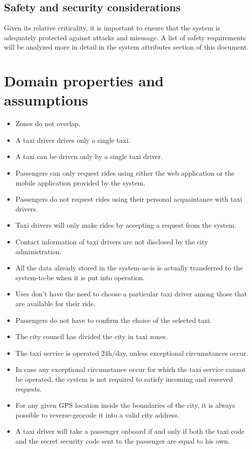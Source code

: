 \subsection{Safety and security considerations}
Given its relative criticality, it is important to ensure that the system is adequately protected against attacks and misusage. A list of safety requirements will be analyzed more in detail in the system attributes section of this document.


\section{Domain properties and assumptions}
\begin{itemize}
\item Zones do not overlap.
\item A taxi driver drives only a single taxi.
\item A taxi can be driven only by a single taxi driver.
\item Passengers can only request rides using either the web application or the mobile application provided by the system.
\item Passengers do not request rides using their personal acquaintance with taxi drivers.
\item Taxi drivers will only make rides by accepting a request from the system.
\item Contact information of taxi drivers are not disclosed by the city administration.
\item All the data already stored in the system-as-is is actually transferred to the system-to-be when it is put into operation.
\item Uses don't have the need to choose a particular taxi driver among those that are available for their ride.
\item Passengers do not have to confirm the choice of the selected taxi.
\item The city council has divided the city in taxi zones.
\item The taxi service is operated 24h/day, unless exceptional circumstances occur.
\item In case any exceptional circumstance occur for which the taxi service cannot be operated, the system is not required to satisfy incoming and reserved requests. 
\item For any given GPS location inside the boundaries of the city, it is always possible to reverse-geocode it into a valid city address. 
\item A taxi driver will take a passenger onboard if and only if both the taxi code and the secret security code sent to the passenger are equal to his own.

\end{itemize}
